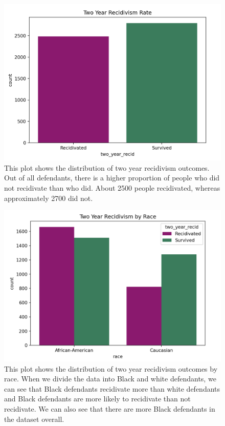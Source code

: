 \documentclass[water,article,submit,moreauthors,pdftex]{mdpi}
\begin{document}
\begin{figure}

{\centering \includegraphics[width=1\linewidth]{../images/recid_bar_plot_new}

}

\caption{This plot shows the distribution of two year recidivism outcomes. Out of all defendants, there is a higher proportion of people who did not recidivate than who did. About 2500 people recidivated, whereas approximately 2700 did not.}\label{fig:recid plot}
\end{figure}

\begin{figure}

{\centering \includegraphics[width=1\linewidth]{../images/race_recid_bar_plot_new}

}

\caption{This plot shows the distribution of two year recidivism outcomes by race. When we divide the data into Black and white defendants, we can see that Black defendants recidivate more than white defendants and Black defendants are more likely to recidivate than not recidivate. We can also see that there are more Black defendants in the dataset overall.}\label{fig:recid race plot}
\end{figure}
\end{document}
